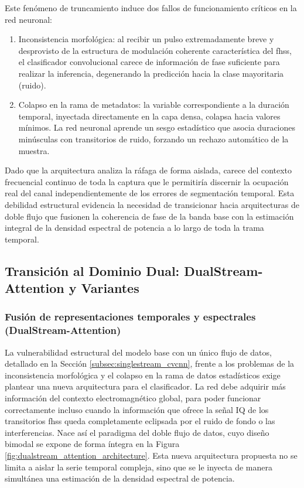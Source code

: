 Este fenómeno de truncamiento induce dos fallos de funcionamiento críticos en la red neuronal:
\begin{enumerate}
    \item Inconsistencia morfológica: al recibir un pulso extremadamente breve y desprovisto de la estructura de modulación coherente característica del \gls{fhss}, el clasificador convolucional carece de información de fase suficiente para realizar la inferencia, degenerando la predicción hacia la clase mayoritaria (ruido).
    \item Colapso en la rama de metadatos: la variable correspondiente a la duración temporal, inyectada directamente en la capa densa, colapsa hacia valores mínimos. La red neuronal aprende un sesgo estadístico que asocia duraciones minúsculas con transitorios de ruido, forzando un rechazo automático de la muestra.
\end{enumerate}

Dado que la arquitectura analiza la ráfaga de forma aislada, carece del contexto frecuencial continuo de toda la captura que le permitiría discernir la ocupación real del canal independientemente de los errores de segmentación temporal. Esta debilidad estructural evidencia la necesidad de transicionar hacia arquitecturas de doble flujo que fusionen la coherencia de fase de la banda base con la estimación integral de la densidad espectral de potencia a lo largo de toda la trama temporal.

\subsection{Transición al Dominio Dual: DualStream-Attention y Variantes}
\label{subsec:dualstream_attn}

\subsubsection{Fusión de representaciones temporales y espectrales (DualStream-Attention)}
La vulnerabilidad estructural del modelo base con un único flujo de datos, detallado en la Sección \ref{subsec:singlestream_cvcnn}, frente a los problemas de la inconsistencia morfológica y el colapso en la rama de datos estadísticos exige plantear una nueva arquitectura para el clasificador. La red debe adquirir más información del contexto electromagnético global, para poder funcionar correctamente incluso cuando la información que ofrece la señal IQ de los transitorios \gls{fhss} queda completamente eclipsada por el ruido de fondo o las interferencias. Nace así el paradigma del doble flujo de datos, cuyo diseño bimodal se expone de forma íntegra en la Figura \ref{fig:dualstream_attention_architecture}. Esta nueva arquitectura propuesta no se limita a aislar la serie temporal compleja, sino que se le inyecta de manera simultánea una estimación de la densidad espectral de potencia. 

